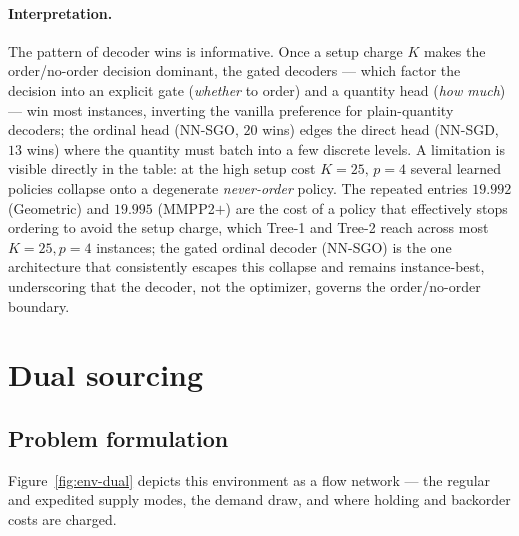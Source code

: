 \documentclass[11pt]{article}
\begin{document}
\paragraph{Interpretation.}
The pattern of decoder wins is informative. Once a setup charge $K$ makes the order/no-order decision
dominant, the gated decoders --- which factor the decision into an explicit gate (\emph{whether} to
order) and a quantity head (\emph{how much}) --- win most instances, inverting the vanilla preference
for plain-quantity decoders; the ordinal head (NN-SGO, $20$ wins) edges the
direct head (NN-SGD, $13$ wins) where the quantity must batch into a few discrete levels. A
limitation is visible directly in the table: at the high setup cost $K=25,\,p=4$ several
learned policies collapse onto a degenerate \emph{never-order} policy. The repeated entries
$19.992$ (Geometric) and $19.995$ (MMPP2$+$) are the cost of a policy that effectively stops ordering
to avoid the setup charge, which Tree-1 and Tree-2 reach across most $K=25,p=4$ instances; the gated
ordinal decoder (NN-SGO) is the one architecture that consistently escapes this collapse and remains
instance-best, underscoring that the decoder, not the optimizer, governs the order/no-order boundary.

\section{Dual sourcing}
\label{sec:dual-sourcing}

\subsection{Problem formulation}
\label{sec:dual-sourcing-formulation}

Figure~\ref{fig:env-dual} depicts this environment as a flow network --- the regular and expedited supply modes, the demand draw, and where holding and backorder costs are charged.
\end{document}
